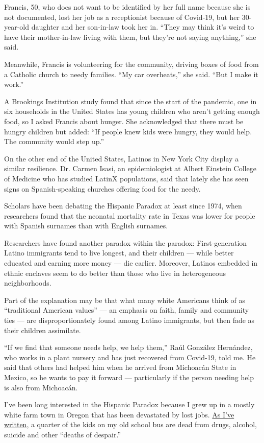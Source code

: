 Francis, 50, who does not want to be identified by her full name because
she is not documented, lost her job as a receptionist because of
Covid-19, but her 30-year-old daughter and her son-in-law took her in.
``They may think it's weird to have their mother-in-law living with
them, but they're not saying anything,'' she said.

Meanwhile, Francis is volunteering for the community, driving boxes of
food from a Catholic church to needy families. ``My car overheats,'' she
said. ``But I make it work.''

A Brookings Institution study found that since the start of the
pandemic, one in six households in the United States has young children
who aren't getting enough food, so I asked Francis about hunger. She
acknowledged that there must be hungry children but added: ``If people
knew kids were hungry, they would help. The community would step up.''

On the other end of the United States, Latinos in New York City display
a similar resilience. Dr. Carmen Isasi, an epidemiologist at Albert
Einstein College of Medicine who has studied LatinX populations, said
that lately she has seen signs on Spanish-speaking churches offering
food for the needy.

Scholars have been debating the Hispanic Paradox at least since 1974,
when researchers found that the neonatal mortality rate in Texas was
lower for people with Spanish surnames than with English surnames.

Researchers have found another paradox within the paradox:
First-generation Latino immigrants tend to live longest, and their
children --- while better educated and earning more money --- die
earlier. Moreover, Latinos embedded in ethnic enclaves seem to do better
than those who live in heterogeneous neighborhoods.

Part of the explanation may be that what many white Americans think of
as ``traditional American values'' --- an emphasis on faith, family and
community ties --- are disproportionately found among Latino immigrants,
but then fade as their children assimilate.

``If we find that someone needs help, we help them,'' Raúl González
Hernández, who works in a plant nursery and has just recovered from
Covid-19, told me. He said that others had helped him when he arrived
from Michoacán State in Mexico, so he wants to pay it forward ---
particularly if the person needing help is also from Michoacán.

I've been long interested in the Hispanic Paradox because I grew up in a
mostly white farm town in Oregon that has been devastated by lost jobs.
\href{https://www.nytimes3xbfgragh.onion/2020/01/09/opinion/sunday/deaths-despair-poverty.html}{As
I've written}, a quarter of the kids on my old school bus are dead from
drugs, alcohol, suicide and other ``deaths of despair.''

